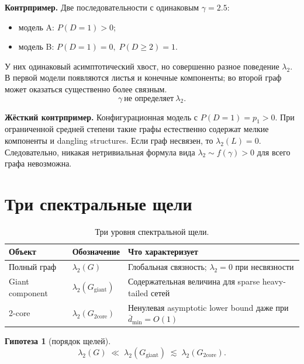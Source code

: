 \documentclass[11pt,a4paper]{article}
\theoremstyle{plain}
\newtheorem{hypothesis}{Гипотеза}
\theoremstyle{definition}
\theoremstyle{remark}
\newcommand{\core}{\mathrm{core}}
\newcommand{\giant}{\mathrm{giant}}
\newcommand{\dbar}{\bar d}
\newcommand{\lamtwo}{\lambda_2}
\newcommand{\Ggiant}{G_{\giant}}
\newcommand{\Gtwo}{G_{2\core}}
\begin{document}
\textbf{Контрпример.} Две последовательности с одинаковым $\gamma=2.5$:
\begin{itemize}[leftmargin=*]
\item модель A: $P(D=1)>0$;
\item модель B: $P(D=1)=0,\;P(D\ge 2)=1$.
\end{itemize}
У них одинаковый асимптотический хвост, но совершенно разное поведение
$\lamtwo$. В первой модели появляются листья и конечные компоненты; во второй
граф может оказаться существенно более связным.
\begin{equation}
\boxed{\;\gamma\ \text{не определяет}\ \lamtwo.\;}
\end{equation}

\textbf{Жёсткий контрпример.} Конфигурационная модель с $P(D=1)=p_1>0$. При
ограниченной средней степени такие графы естественно содержат мелкие
компоненты и dangling structures. Если граф несвязен, то $\lamtwo(L)=0$.
Следовательно, никакая нетривиальная формула вида $\lamtwo\sim f(\gamma)>0$
для всего графа невозможна.

\section{Три спектральные щели}
\label{sec:three}

\begin{table}[h]
\centering
\begin{tabular}{llp{7.2cm}}
\toprule
Объект & Обозначение & Что характеризует \\
\midrule
Полный граф & $\lamtwo(G)$ & Глобальная связность; $\lamtwo=0$ при несвязности \\
Giant component & $\lamtwo(\Ggiant)$ & Содержательная величина для sparse heavy-tailed сетей \\
2-core & $\lamtwo(\Gtwo)$ & Ненулевая asymptotic lower bound даже при $\dbar_{\min}=O(1)$ \\
\bottomrule
\end{tabular}
\caption{Три уровня спектральной щели.}
\end{table}

\begin{hypothesis}[порядок щелей]
\begin{equation}
\boxed{\;\lamtwo(G)\;\ll\;\lamtwo(\Ggiant)\;\lesssim\;\lamtwo(\Gtwo).\;}
\end{equation}
\end{hypothesis}
\end{document}

